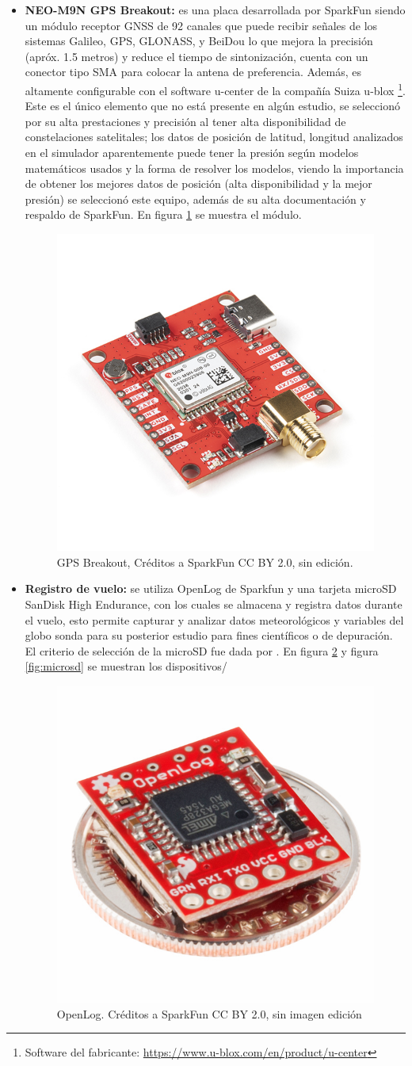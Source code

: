 \begin{itemize}
    \item \textbf{NEO-M9N GPS Breakout:}  es una placa desarrollada por SparkFun siendo un módulo receptor GNSS de 92 canales que puede recibir señales de los sistemas Galileo, GPS, GLONASS,  y BeiDou lo que mejora la precisión (apróx. 1.5 metros) y reduce el tiempo de sintonización,  cuenta con un conector tipo SMA para colocar la antena de preferencia. Además, es altamente configurable con el software u-center de la compañía Suiza u-blox \footnote{Software del fabricante: \url{https://www.u-blox.com/en/product/u-center}}.  Este es el único elemento que no está presente en algún estudio, se seleccionó por su alta prestaciones y precisión al tener alta disponibilidad de constelaciones satelitales;  los datos de posición de latitud, longitud analizados en el simulador aparentemente puede tener la presión según modelos matemáticos usados y la forma de resolver los modelos, viendo la importancia de obtener los mejores datos de posición (alta disponibilidad y la mejor presión) se seleccionó este equipo, además de su alta documentación y respaldo de SparkFun. En figura \ref{fig:gnss} se muestra el módulo.

    \begin{figure} [h]
        \centering
        \includegraphics[width=0.25\linewidth]{document/figures/04_GPS__NEO-M9N__SMA__qwiic_sparkFun.jpg}
        \caption{GPS Breakout, Créditos a SparkFun CC BY 2.0, sin edición.}
        \label{fig:gnss}
    \end{figure}

    \item \textbf{Registro de vuelo:}  se utiliza OpenLog de Sparkfun y una tarjeta microSD SanDisk High Endurance, con los cuales se almacena y registra datos durante el vuelo,  esto permite capturar y analizar datos meteorológicos y variables del globo sonda para su posterior estudio para fines científicos o de depuración. El criterio de selección de la microSD fue dada por  \cite{sd_pycubed, pycubed}. En figura \ref{fig:openlog} y figura \ref{fig:microsd}  se muestran los dispositivos/
\begin{figure}[h]
    \centering
    \includegraphics[width=0.25\linewidth]{document/figures/04_OpenLog_SparkFun.jpg}
    \caption{OpenLog. Créditos a SparkFun CC BY 2.0, sin imagen edición}
    \label{fig:openlog}
\end{figure}


\end{itemize}
